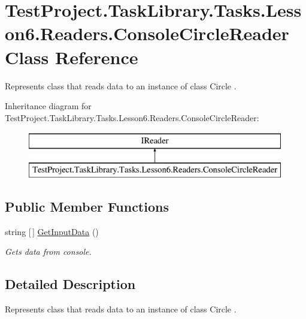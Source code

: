 \hypertarget{class_test_project_1_1_task_library_1_1_tasks_1_1_lesson6_1_1_readers_1_1_console_circle_reader}{}\section{Test\+Project.\+Task\+Library.\+Tasks.\+Lesson6.\+Readers.\+Console\+Circle\+Reader Class Reference}
\label{class_test_project_1_1_task_library_1_1_tasks_1_1_lesson6_1_1_readers_1_1_console_circle_reader}


Represents class that reads data to an instance of class Circle .  


Inheritance diagram for Test\+Project.\+Task\+Library.\+Tasks.\+Lesson6.\+Readers.\+Console\+Circle\+Reader\+:\begin{figure}[H]
\begin{center}
\leavevmode
\includegraphics[height=2.000000cm]{class_test_project_1_1_task_library_1_1_tasks_1_1_lesson6_1_1_readers_1_1_console_circle_reader}
\end{center}
\end{figure}
\subsection*{Public Member Functions}
\begin{DoxyCompactItemize}
\item 
string \mbox{[}$\,$\mbox{]} \mbox{\hyperlink{class_test_project_1_1_task_library_1_1_tasks_1_1_lesson6_1_1_readers_1_1_console_circle_reader_ad0d41c4bd3a2294413188932318f2fd5}{Get\+Input\+Data}} ()
\begin{DoxyCompactList}\small\item\em Gets data from console. \end{DoxyCompactList}\end{DoxyCompactItemize}


\subsection{Detailed Description}
Represents class that reads data to an instance of class Circle . 



